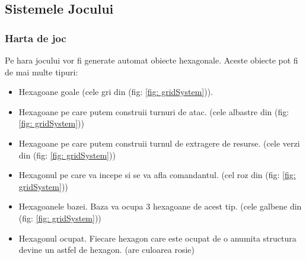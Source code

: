 \documentclass[12pt, a4paper]{article}
\begin{document}
	



	

	
	
	\subsection{Sistemele Jocului}
	
	\subsubsection{Harta de joc}
	
	Pe hara jocului vor fi generate automat obiecte hexagonale. Aceste obiecte pot fi de mai multe tipuri:
	\begin{itemize}
		\item Hexagoane goale (cele gri din (fig: \ref{fig: gridSystem})).
		\item Hexagoane pe care putem construii turnuri de atac. (cele albastre din (fig: \ref{fig: gridSystem}))
		\item Hexagoane pe care putem construii turnul de extragere de resurse. (cele verzi din (fig: \ref{fig: gridSystem}))
		\item Hexagonul pe care va incepe si se va afla comandantul. (cel roz din (fig: \ref{fig: gridSystem}))
		\item Hexagoanele bazei. Baza va ocupa 3 hexagoane de acest tip. (cele galbene din (fig: \ref{fig: gridSystem}))
		\item Hexagonul ocupat. Fiecare hexagon care este ocupat de o anumita structura devine un astfel de hexagon. (are culoarea rosie)
	\end{itemize}
\end{document}
